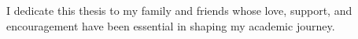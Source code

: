 \noindent I dedicate this thesis to my family and friends whose love, support, and encouragement have been essential in shaping my academic journey.

